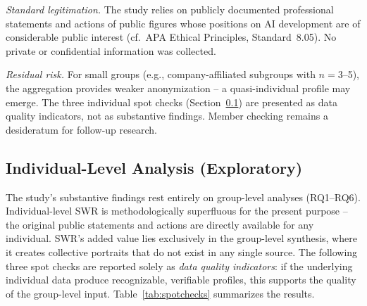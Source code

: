 \documentclass[12pt,a4paper]{article}
\begin{document}
\emph{Standard legitimation.} The study relies on publicly documented professional statements and actions of public figures whose positions on AI development are of considerable public interest (cf.\ APA Ethical Principles, Standard~8.05). No private or confidential information was collected.

\emph{Residual risk.} For small groups (e.g., company-affiliated subgroups with $n = 3$--5), the aggregation provides weaker anonymization -- a quasi-individual profile may emerge. The three individual spot checks (Section~\ref{sec:limitationen:spotchecks}) are presented as data quality indicators, not as substantive findings. Member checking \citep{SoysalTurkmen2024} remains a desideratum for follow-up research.


\subsection{Individual-Level Analysis (Exploratory)}
\label{sec:limitationen:spotchecks}

The study's substantive findings rest entirely on group-level analyses (RQ1--RQ6). Individual-level SWR is methodologically superfluous for the present purpose -- the original public statements and actions are directly available for any individual. SWR's added value lies exclusively in the group-level synthesis, where it creates collective portraits that do not exist in any single source. The following three spot checks are reported solely as \emph{data quality indicators}: if the underlying individual data produce recognizable, verifiable profiles, this supports the quality of the group-level input. Table~\ref{tab:spotchecks} summarizes the results.
\end{document}
